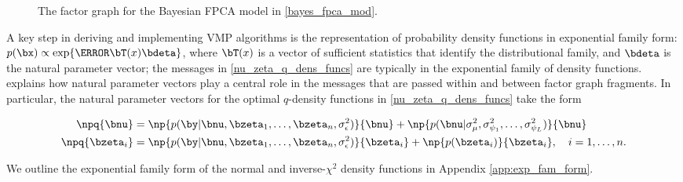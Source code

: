 \documentclass[ba]{imsart}
\numberwithin{equation}{section}
\theoremstyle{plain}
\def\sigsqeps{\sigma^2_{\epsilon}}
\def\sigsqmu{\sigma^2_{\mu}}
\newcommand\sigsqpsi[1]{\sigma^2_{\psi_{#1}}}
\begin{document}
\begin{figure}
\caption{The factor graph for the Bayesian FPCA model in \eqref{bayes_fpca_mod}.}
\label{fig:fg_fpca}
\end{figure}

A key step in deriving and implementing VMP algorithms is the representation of probability density functions
in exponential family form: $p (\bx) \propto \exp \{ \T{\bT(x)} \bdeta \}$, where $\bT (x)$ is a vector of sufficient
statistics that identify the distributional family, and $\bdeta$ is the natural parameter vector;
the messages in \eqref{nu_zeta_q_dens_funcs} are typically in the exponential family of density functions.
\citet{wand17} explains how natural parameter vectors play a central role in the messages that are
passed within and between factor graph fragments. In particular, the natural parameter vectors for the
optimal $q$-density functions in \eqref{nu_zeta_q_dens_funcs} take the form

\begin{align}
\begin{split}
	\npq{\bnu} &=
		\np{p (\by | \bnu, \bzeta_1, \dots, \bzeta_n, \sigsqeps)}{\bnu} +
		\np{p (\bnu | \sigsqmu, \sigsqpsi{1}, \dots, \sigsqpsi{L})}{\bnu} \\
	\npq{\bzeta_i} &=
		\np{p (\by | \bnu, \bzeta_1, \dots, \bzeta_n, \sigsqeps)}{\bzeta_i} +
		\np{p (\bzeta_i)}{\bzeta_i} , \quad i = 1, \dots, n.
\end{split}
\label{etaq}
\end{align}

\noindent We outline the exponential family form of the normal and inverse-$\chi^2$ density functions in
Appendix \ref{app:exp_fam_form}.
\end{document}
